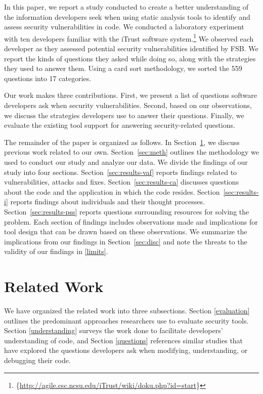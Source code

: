 \documentclass[conference]{IEEEtran}
\newcommand{\blind}[1]{{\color{white}\{#1\}}}
\begin{document}
In this paper, we report a study conducted to create a better understanding of the information developers seek when using static analysis tools to identify and assess security vulnerabilities in code.
We conducted a laboratory experiment with ten developers familiar with the iTrust software system.\footnote{\blind{\url{http://agile.csc.ncsu.edu/iTrust/wiki/doku.php?id=start}}} 
We observed each developer as they assessed potential security vulnerabilities identified by FSB. 
We report the kinds of questions they asked while doing so, along with the strategies they used to answer them.
Using a card sort methodology, we sorted the 559 questions into 17 categories. 

Our work makes three contributions. 
First, we present a list of questions software developers ask when security vulnerabilities.
Second, based on our observations, we discuss the strategies developers use to answer their questions.
Finally, we evaluate the existing tool support for answering security-related questions.

The remainder of the paper is organized as follows. 
In Section~\ref{sec:rw}, we discuss previous work related to our own. 
Section~\ref{sec:meth} outlines the methodology we used to conduct our study and analyze our data. 
We divide the findings of our study into four sections. 
Section~\ref{sec:results-vaf} reports findings related to vulnerabilities, attacks and fixes. 
Section~\ref{sec:results-ca} discusses questions about the code and the application in which the code resides.
Section~\ref{sec:results-i} reports findings about individuals and their thought processes.
Section~\ref{sec:results-pss} reports questions surrounding resources for solving the problem.
Each section of findings includes observations made and implications for tool design that can be drawn based on these observations. 
We summarize the implications from our findings in Section~\ref{sec:disc} and note the threats to the validity of our findings in \ref{limits}.




\section{Related Work}
\label{sec:rw}

We have organized the related work into three subsections. Section \ref{evaluation} outlines the predominant approaches researchers use to evaluate security tools. 
Section \ref{understanding} surveys the work done to facilitate developers' understanding of code, and Section \ref{questions} references similar studies that have explored the questions developers ask when modifying, understanding, or debugging their code.
\end{document}
